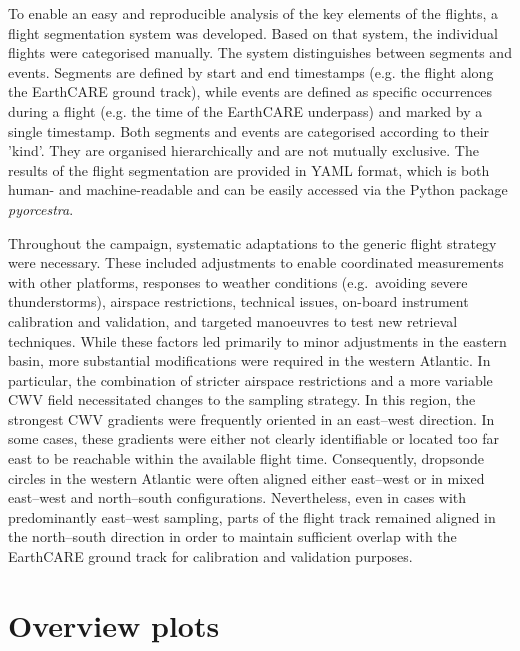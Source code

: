 \documentclass{article}
\begin{document}
To enable an easy and reproducible analysis of the key elements of the flights, a flight segmentation system was developed. Based on that system, the individual flights were categorised manually. The system distinguishes between segments and events. Segments are defined by start and end timestamps (e.g. the flight along the EarthCARE ground track), while events are defined as specific occurrences during a flight (e.g. the time of the EarthCARE underpass) and marked by a single timestamp. Both segments and events are categorised according to their 'kind'. They are organised hierarchically and are not mutually exclusive. The results of the flight segmentation are provided in YAML format, which is both human- and machine-readable and can be easily accessed via the Python package \textit{pyorcestra}.

Throughout the campaign, systematic adaptations to the generic flight strategy were necessary. These included adjustments to enable coordinated measurements with other platforms, responses to weather conditions (e.g.~avoiding severe thunderstorms), airspace restrictions, technical issues, on-board instrument calibration and validation, and targeted manoeuvres to test new retrieval techniques. While these factors led primarily to minor adjustments in the eastern basin, more substantial modifications were required in the western Atlantic. In particular, the combination of stricter airspace restrictions and a more variable CWV field necessitated changes to the sampling strategy. In this region, the strongest CWV gradients were frequently oriented in an east--west direction. In some cases, these gradients were either not clearly identifiable or located too far east to be reachable within the available flight time. Consequently, dropsonde circles in the western Atlantic were often aligned either east--west or in mixed east--west and north--south configurations. Nevertheless, even in cases with predominantly east--west sampling, parts of the flight track remained aligned in the north--south direction in order to maintain sufficient overlap with the EarthCARE ground track for calibration and validation purposes.

\section{Overview plots}

\end{document}
